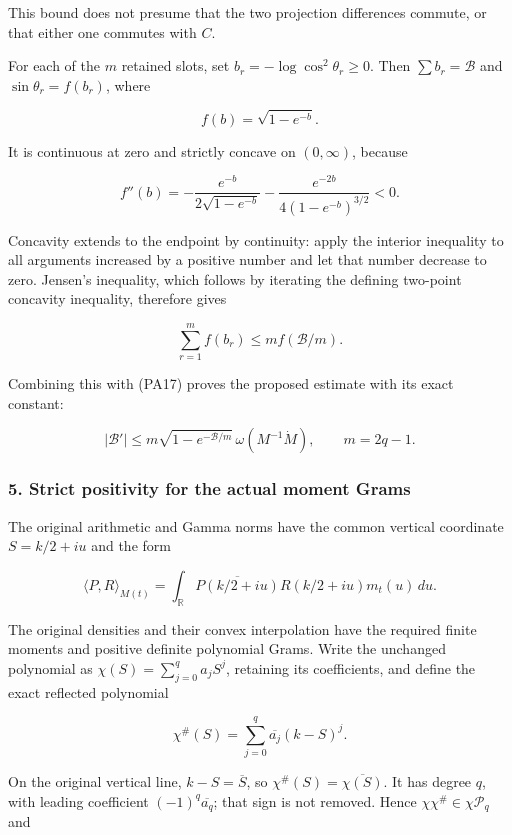 This bound does not presume that the two projection differences commute, or that either one commutes with \(C\).

For each of the \(m\) retained slots, set \(b_r=-\log\cos^2\theta_r\ge0\). Then \(\sum b_r=\mathcal B\) and \(\sin\theta_r=f(b_r)\), where

\[
f(b)=\sqrt{1-e^{-b}}.
\tag{PA18}
\]

It is continuous at zero and strictly concave on \((0,\infty)\), because

\[
f''(b)=-\frac{e^{-b}}{2\sqrt{1-e^{-b}}}
        -\frac{e^{-2b}}{4(1-e^{-b})^{3/2}}<0.
\]

Concavity extends to the endpoint by continuity: apply the interior inequality to all arguments increased by a positive number and let that number decrease to zero. Jensen's inequality, which follows by iterating the defining two-point concavity inequality, therefore gives

\[
\sum_{r=1}^m f(b_r)\le m f(\mathcal B/m).
\]

Combining this with (PA17) proves the proposed estimate with its exact constant:

\[
\boxed{
|\mathcal B'|
\le m\sqrt{1-e^{-\mathcal B/m}}\,\omega(M^{-1}\dot M),
\qquad m=2q-1.
}
\tag{PA19}
\]

\subsubsection{5. Strict positivity for the actual moment Grams}\label{endpoint-principal_angle_volume_review--strict-positivity-for-the-actual-moment-grams}

The original arithmetic and Gamma norms have the common vertical coordinate \(S=k/2+iu\) and the form

\[
\langle P,R\rangle_{M(t)}
=\int_{\mathbb R}\overline{P(k/2+iu)}R(k/2+iu)m_t(u)\,du.
\tag{PA20}
\]

The original densities and their convex interpolation have the required finite moments and positive definite polynomial Grams. Write the unchanged polynomial as \(\chi(S)=\sum_{j=0}^q a_jS^j\), retaining its coefficients, and define the exact reflected polynomial

\[
\chi^\#(S)=\sum_{j=0}^q\overline{a_j}(k-S)^j.
\tag{PA21}
\]

On the original vertical line, \(k-S=\overline S\), so \(\chi^\#(S)=\overline{\chi(S)}\). It has degree \(q\), with leading coefficient \((-1)^q\overline{a_q}\); that sign is not removed. Hence \(\chi\chi^\#\in\chi\mathcal P_q\) and


